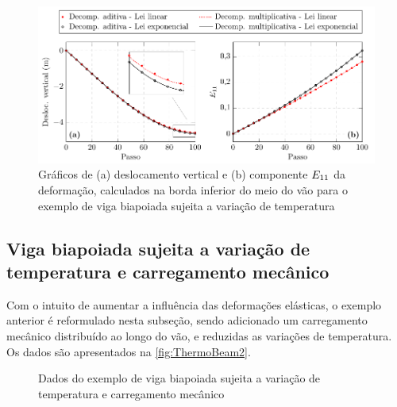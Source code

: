 \documentclass[Tese.tex]{subfiles}
\begin{document}
\begin{figure}[!htb]
	\centering
	\caption{Gráficos de (a) deslocamento vertical e (b) componente ${E}_{11}$ da deformação, calculados na borda inferior do meio do vão para o exemplo de viga biapoiada sujeita a variação de temperatura}
	\label{fig:v}
	\includegraphics[scale=1.1]{Figuras/ThermoBeam/v.pdf}
\end{figure}

\subsection{Viga biapoiada sujeita a variação de temperatura e carregamento mecânico}\label{subsec:thermoBeam2}

Com o intuito de aumentar a influência das deformações elásticas, o exemplo anterior é reformulado nesta subseção, sendo adicionado um carregamento mecânico distribuído ao longo do vão, e reduzidas as variações de temperatura. Os dados são apresentados na \autoref{fig:ThermoBeam2}.

\begin{figure}[!htb]
	\centering
	\caption{Dados do exemplo de viga biapoiada sujeita a variação de temperatura e carregamento mecânico}
	\label{fig:ThermoBeam2}
	{\small
		\noindent{}
	}	
\end{figure}
\end{document}
